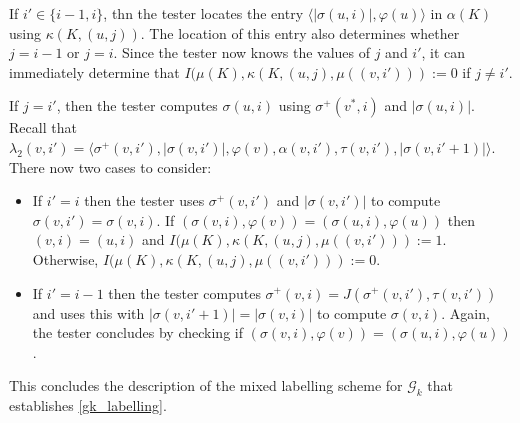 \documentclass{patmorin}
\newcommand{\calG}{\mathcal{G}}
\begin{document}
  If $i'\in\{i-1,i\}$, thn the tester locates the entry $\langle |\sigma(u,i)|,\varphi(u)\rangle$ in $\alpha(K)$ using $\kappa(K,(u,j))$. The location of this entry also determines whether $j=i-1$ or $j=i$.  Since the tester now knows the values of $j$ and $i'$, it can immediately determine that $I(\mu(K),\kappa(K,(u,j),\mu((v,i'))):=0$ if $j\neq i'$. 
  
  If $j=i'$, then the tester computes $\sigma(u,i)$ using $\sigma^+(v^*,i)$ and $|\sigma(u,i)|$. Recall that $\lambda_2(v,i')=\langle \sigma^+(v,i'), |\sigma(v,i')|, \varphi(v),\alpha(v,i'),\tau(v,i'),|\sigma(v,i'+1)|\rangle$.
  There now two cases to consider:
  \begin{itemize}
    \item If $i'=i$ then the tester uses $\sigma^+(v,i')$ and $|\sigma(v,i')|$ to compute $\sigma(v,i')=\sigma(v,i)$.  If $(\sigma(v,i),\varphi(v))=(\sigma(u,i),\varphi(u))$ then $(v,i)=(u,i)$ and  $I(\mu(K),\kappa(K,(u,j),\mu((v,i'))):=1$.  Otherwise, $I(\mu(K),\kappa(K,(u,j),\mu((v,i'))):=0$.

    \item If $i'=i-1$ then the tester computes $\sigma^+(v,i)=J(\sigma^+(v,i'),\tau(v,i'))$ and uses this with $|\sigma(v,i'+1)|=|\sigma(v,i)|$ to compute $\sigma(v,i)$.  Again, the tester concludes by checking if $(\sigma(v,i),\varphi(v))=(\sigma(u,i),\varphi(u))$.
  \end{itemize}
  This concludes the description of the mixed labelling scheme for $\calG_k$ that establishes \cref{gk_labelling}.
\end{document}
